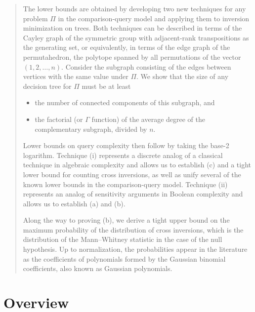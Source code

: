 \documentclass{toc}
\begin{document}
\begin{frontmatter}
\begin{abstract}
The lower bounds are obtained by developing two new
%
%
techniques for any problem $\Pi$  %
%
in the comparison-query model and applying them to inversion minimization on trees. Both techniques can be described in terms of the Cayley graph of the symmetric group with adjacent-rank transpositions as the generating set, or equivalently, in terms of the edge graph of the permutahedron, the polytope spanned by all permutations of the vector $(1,2,\dots,n)$. Consider the subgraph consisting of the edges between vertices with the same value under $\Pi$. We show that the size of any decision tree for $\Pi$ must be at least %
\begin{itemize}
\item[(i)] the number of connected components of this subgraph, and
%
\item[(ii)] the factorial (or $\Gamma$ function) of the average degree of the complementary
     subgraph, divided by $n$.
\end{itemize}
%
%
%
%
Lower bounds on query complexity then follow by taking the base-2 logarithm. Technique (i) represents a discrete analog of a classical technique in algebraic complexity and allows us to establish (c) and a tight lower bound for counting cross inversions, as well as unify several of the known lower bounds in the comparison-query model. Technique (ii) represents an analog of sensitivity arguments in Boolean complexity and allows us to establish (a) and (b). 

Along the way to proving (b), we derive a tight upper bound on the maximum probability of the distribution of cross inversions, which is the distribution of the Mann--Whitney statistic in the case of the null hypothesis. Up to normalization, the probabilities appear in the literature as the coefficients of polynomials formed by the Gaussian binomial coefficients, also known as Gaussian polynomials.
\end{abstract}

%

\end{frontmatter}

%
%
%



\section{Overview}
\label{sec:overview}
\end{document}
